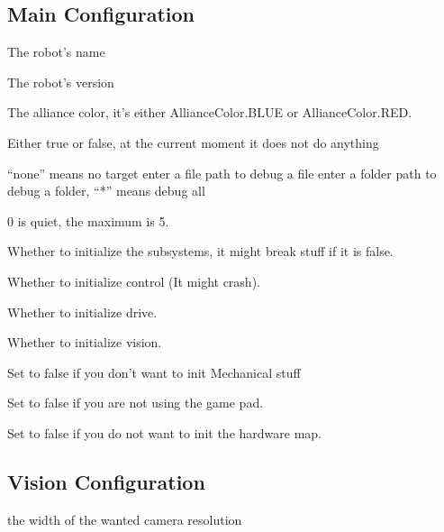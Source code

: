 \documentclass[letterpaper,10pt,english]{sphinxmanual}
\begin{document}
\subsection{Main Configuration}
\label{\detokenize{configuration:main-configuration}}
\sphinxAtStartPar
{} \sphinxhyphen{} The robot’s name

\sphinxAtStartPar
{} \sphinxhyphen{} The robot’s version

\sphinxAtStartPar
{} \sphinxhyphen{} The alliance color, it’s either AllianceColor.BLUE or AllianceColor.RED.

\sphinxAtStartPar
{} \sphinxhyphen{} Either true or false, at the current moment it does not do anything

\sphinxAtStartPar
{} \sphinxhyphen{} “none” means no target enter a file path to debug a file enter a folder path to debug a folder, “*” means
debug all

\sphinxAtStartPar
{} \sphinxhyphen{} 0 is quiet, the maximum is 5.

\sphinxAtStartPar
{} \sphinxhyphen{} Whether to initialize the subsystems, it might break stuff if it is false.

\sphinxAtStartPar
{} \sphinxhyphen{} Whether to initialize control (It might crash).

\sphinxAtStartPar
{} \sphinxhyphen{} Whether to initialize drive.

\sphinxAtStartPar
{} \sphinxhyphen{} Whether to initialize vision.

\sphinxAtStartPar
{} \sphinxhyphen{} Set to false if you don’t want to init Mechanical stuff

\sphinxAtStartPar
{} \sphinxhyphen{} Set to false if you are not using the game pad.

\sphinxAtStartPar
{} \sphinxhyphen{} Set to false if you do not want to init the hardware map.


\subsection{Vision Configuration}
\label{\detokenize{configuration:vision-configuration}}
\sphinxAtStartPar
{} \sphinxhyphen{} the width of the wanted camera resolution
\end{document}
